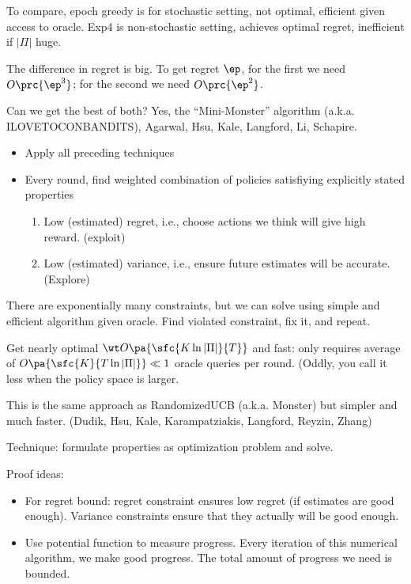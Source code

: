 To compare, epoch greedy is for stochastic setting, not optimal, efficient given access to oracle. Exp4 is non-stochastic setting, achieves optimal regret, inefficient if $|\Pi|$ huge.

The difference in regret is big. To get regret $\ep$, for the first we need $O\prc{\ep^3}$; for the second we need $O\prc{\ep^2}$.

Can we get the best of both? Yes, the ``Mini-Monster'' algorithm (a.k.a. ILOVETOCONBANDITS), Agarwal, Hsu, Kale, Langford, Li, Schapire.

\begin{itemize}
\item
Apply all preceding techniques
\item
Every round, find weighted combination of policies satisfiying explicitly stated properties
\begin{enumerate}
\item
Low (estimated) regret, i.e., choose actions we think will give high reward. (exploit)
\item
Low (estimated) variance, i.e., ensure future estimates will be accurate. (Explore)
\end{enumerate}
\end{itemize}
There are exponentially many constraints, but we can solve using simple and efficient algorithm given oracle. Find violated constraint, fix it, and repeat.

Get nearly optimal $\wt O\pa{\sfc{K\ln |\Pi|}{T}}$ and fast: only requires average of $O\pa{\sfc{K}{T\ln |\Pi|}}\ll 1$  oracle queries per round. %
(Oddly, you call it less when the policy space is larger.

This is the same approach as RandomizedUCB (a.k.a. Monster) but simpler and much faster. (Dudik, Hsu, Kale, Karampatziakis, Langford, Reyzin, Zhang)

Technique: formulate properties as optimization problem and solve.

Proof ideas:
\begin{itemize}
\item
 For regret bound: regret constraint ensures low regret (if estimates are good enough). Variance constraints ensure that they actually will be good enough.
\item
Use potential function to measure progress. Every iteration of this numerical algorithm, we make good progress. The total amount of progress we need is bounded.
\end{itemize}

